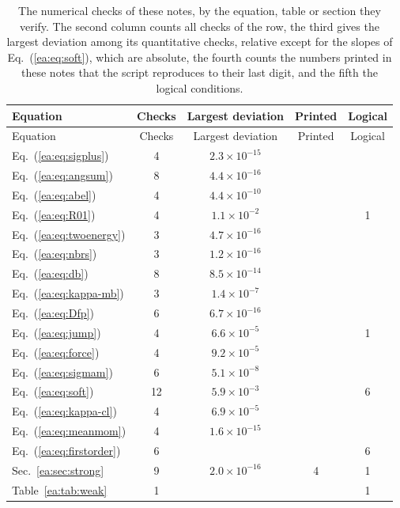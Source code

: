 \begin{longtable}{L{4.0cm}cccc}
\caption{The numerical checks of these notes, by the equation, table or section they verify. The second column counts all checks of the row, the third gives the largest deviation among its quantitative checks, relative except for the slopes of Eq.~(\ref*{ea:eq:soft}), which are absolute, the fourth counts the numbers printed in these notes that the script reproduces to their last digit, and the fifth the logical conditions.}\label{ea:tab:checks}\\
\toprule
Equation & Checks & Largest deviation & Printed & Logical\\
\midrule
\endfirsthead
\toprule
Equation & Checks & Largest deviation & Printed & Logical\\
\midrule
\endhead
\bottomrule
\endfoot
Eq.~(\ref*{ea:eq:sigplus}) & 4 & $2.3\times10^{-15}$ &  & \\
Eq.~(\ref*{ea:eq:angsum}) & 8 & $4.4\times10^{-16}$ &  & \\
Eq.~(\ref*{ea:eq:abel}) & 4 & $4.4\times10^{-10}$ &  & \\
Eq.~(\ref*{ea:eq:R01}) & 4 & $1.1\times10^{-2}$ &  & 1\\
Eq.~(\ref*{ea:eq:twoenergy}) & 3 & $4.7\times10^{-16}$ &  & \\
Eq.~(\ref*{ea:eq:nbrs}) & 3 & $1.2\times10^{-16}$ &  & \\
Eq.~(\ref*{ea:eq:db}) & 8 & $8.5\times10^{-14}$ &  & \\
Eq.~(\ref*{ea:eq:kappa-mb}) & 3 & $1.4\times10^{-7}$ &  & \\
Eq.~(\ref*{ea:eq:Dfp}) & 6 & $6.7\times10^{-16}$ &  & \\
Eq.~(\ref*{ea:eq:jump}) & 4 & $6.6\times10^{-5}$ &  & 1\\
Eq.~(\ref*{ea:eq:force}) & 4 & $9.2\times10^{-5}$ &  & \\
Eq.~(\ref*{ea:eq:sigmam}) & 6 & $5.1\times10^{-8}$ &  & \\
Eq.~(\ref*{ea:eq:soft}) & 12 & $5.9\times10^{-3}$ &  & 6\\
Eq.~(\ref*{ea:eq:kappa-cl}) & 4 & $6.9\times10^{-5}$ &  & \\
Eq.~(\ref*{ea:eq:meanmom}) & 4 & $1.6\times10^{-15}$ &  & \\
Eq.~(\ref*{ea:eq:firstorder}) & 6 &  &  & 6\\
Sec.~\ref*{ea:sec:strong} & 9 & $2.0\times10^{-16}$ & 4 & 1\\
Table~\ref*{ea:tab:weak} & 1 &  &  & 1\\

\end{longtable}
